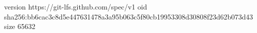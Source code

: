 version https://git-lfs.github.com/spec/v1
oid sha256:bb6cac3c8d5e447631478a3a95b063c5f80cb19953308d30808f23d62b073d43
size 65632

